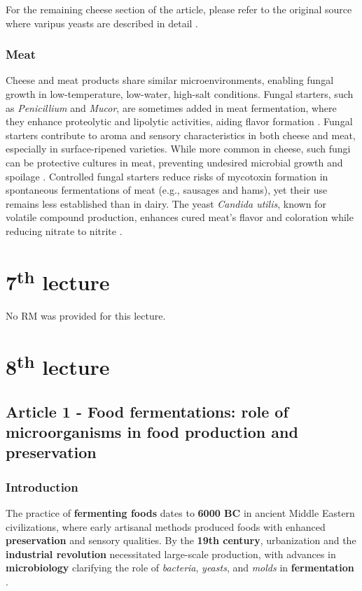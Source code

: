 \vspace{1em}
For the remaining cheese section of the article, please refer to the original source where varipus yeasts are described in detail \cite*{L6-HealthDisease}.

\subsubsection*{Meat}
Cheese and meat products share similar microenvironments, enabling fungal growth in low-temperature, low-water, high-salt conditions. Fungal starters, such as \textit{Penicillium} and \textit{Mucor}, are sometimes added in meat fermentation, where they enhance proteolytic and lipolytic activities, aiding flavor formation \cite*{L6-HealthDisease}. Fungal starters contribute to aroma and sensory characteristics in both cheese and meat, especially in surface-ripened varieties. While more common in cheese, such fungi can be protective cultures in meat, preventing undesired microbial growth and spoilage \cite*{L6-HealthDisease}. Controlled fungal starters reduce risks of mycotoxin formation in spontaneous fermentations of meat (e.g., sausages and hams), yet their use remains less established than in dairy. The yeast \textit{Candida utilis}, known for volatile compound production, enhances cured meat's flavor and coloration while reducing nitrate to nitrite \cite*{L6-HealthDisease}.

\section{7\texorpdfstring{\textsuperscript{th}}{th} lecture}
No RM was provided for this lecture.

\section{8\texorpdfstring{\textsuperscript{th}}{th} lecture}
\subsection{Article 1 - Food fermentations: role of microorganisms in food production and preservation}
\subsubsection*{Introduction}
The practice of \textbf{fermenting foods} dates to \textbf{6000 BC} in ancient Middle Eastern civilizations, where early artisanal methods produced foods with enhanced \textbf{preservation} and sensory qualities. By the \textbf{19th century}, urbanization and the \textbf{industrial revolution} necessitated large-scale production, with advances in \textbf{microbiology} clarifying the role of \textit{bacteria}, \textit{yeasts}, and \textit{molds} in \textbf{fermentation} \cite*{L8-MicroInFood}.

